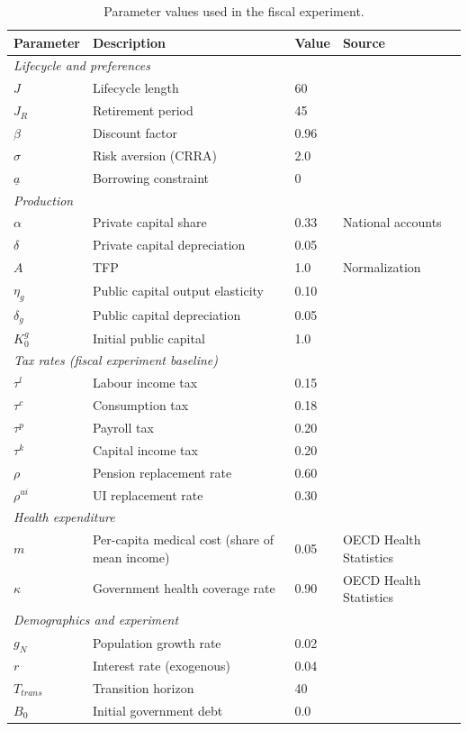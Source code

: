 \begin{table}[H]
\centering
\small
\caption{Parameter values used in the fiscal experiment.}
\label{tab:current-params}
\begin{tabular}{llll}
\toprule
Parameter & Description & Value & Source \\
\midrule
\multicolumn{4}{l}{\textit{Lifecycle and preferences}} \\
$J$ & Lifecycle length & 60 & \\
$J_R$ & Retirement period & 45 & \\
$\beta$ & Discount factor & 0.96 & \\
$\sigma$ & Risk aversion (CRRA) & 2.0 & \\
$\underline{a}$ & Borrowing constraint & 0 & \\
\midrule
\multicolumn{4}{l}{\textit{Production}} \\
$\alpha$ & Private capital share & 0.33 & National accounts \\
$\delta$ & Private capital depreciation & 0.05 & \\
$A$ & TFP & 1.0 & Normalization \\
$\eta_g$ & Public capital output elasticity & 0.10 & \cite{BaxterKing_AER93} \\
$\delta_g$ & Public capital depreciation & 0.05 & \\
$K_0^g$ & Initial public capital & 1.0 & \\
\midrule
\multicolumn{4}{l}{\textit{Tax rates (fiscal experiment baseline)}} \\
$\tau^l$ & Labour income tax & 0.15 & \\
$\tau^c$ & Consumption tax & 0.18 & \\
$\tau^p$ & Payroll tax & 0.20 & \\
$\tau^k$ & Capital income tax & 0.20 & \\
$\rho$ & Pension replacement rate & 0.60 & \\
$\rho^{ui}$ & UI replacement rate & 0.30 & \\
\midrule
\multicolumn{4}{l}{\textit{Health expenditure}} \\
$m$ & Per-capita medical cost (share of mean income) & 0.05 & OECD Health Statistics \\
$\kappa$ & Government health coverage rate & 0.90 & OECD Health Statistics \\
\midrule
\multicolumn{4}{l}{\textit{Demographics and experiment}} \\
$g_N$ & Population growth rate & 0.02 & \\
$r$ & Interest rate (exogenous) & 0.04 & \\
$T_{trans}$ & Transition horizon & 40 & \\
$B_0$ & Initial government debt & 0.0 & \\
\bottomrule
\end{tabular}
\end{table}

